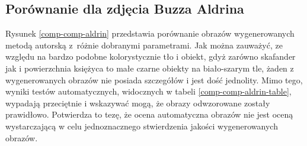         \subsection{Porównanie dla zdjęcia Buzza Aldrina}
    	Rysunek \ref{comp-comp-aldrin} przedstawia porównanie obrazów wygenerowanych metodą autorską z~różnie dobranymi parametrami. Jak można zauważyć, ze względu na bardzo podobne kolorystycznie tło i obiekt, gdyż zarówno skafander jak i powierzchnia księżyca to małe czarne obiekty na biało-szarym tle, żaden z wygenerowanych obrazów nie posiada szczegółów i jest dość jednolity. Mimo tego, wyniki testów automatycznych, widocznych w tabeli \ref{comp-comp-aldrin-table}, wypadają przeciętnie i wskazywać mogą, że obrazy odwzorowane zostały prawidłowo. Potwierdza to tezę, że ocena automatyczna obrazów nie jest oceną wystarczającą w celu jednoznacznego stwierdzenia jakości wygenerowanych obrazów. 
